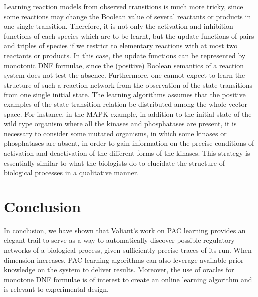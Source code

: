 \documentclass{llncs}
\begin{document}
  Learning reaction models from observed transitions is much more tricky,
  since some reactions may change the Boolean value of several reactants or products in one single transition.
  Therefore, it is not only the activation and inhibition functions of each species which are to be learnt,
  but the update functions of pairs and triples of species if we restrict to elementary reactions with at most two reactants or products.
  In this case, the update functions can be represented by monotonic DNF formulae, since the (positive) Boolean semantics of a reaction system does not test the absence.
Furthermore,   one cannot expect to learn the structure of such a reaction network
from the observation of the state transitions from one single initial state.
The learning algorithms assumes that the positive examples of the state transition relation be distributed
among the whole vector space.
For instance, in the MAPK example, in addition to the initial state of the wild type organism where all the kinases and phosphatases are present,
it is necessary to consider some mutated organisms, in which some kinases or phosphatases are absent,
in order to gain information on the precise conditions of activation and deactivation of the different forms of the kinases.
This strategy is essentially similar to what the biologists do to elucidate the structure of biological processes
in a qualitative manner.


\section{Conclusion}

In conclusion, we have shown that Valiant's work on PAC learning provides an elegant trail to serve as a way to automatically discover possible regulatory networks of a biological process, given sufficiently precise traces of its run.
When dimension increases, PAC learning algorithms can also leverage available prior knowledge on the system to deliver results.
Moreover, the use of oracles for monotone DNF formulae is of interest to create an online learning algorithm
and is relevant to experimental design.
\end{document}
